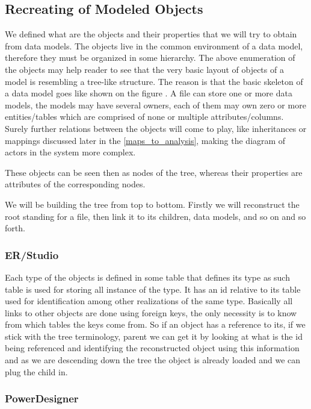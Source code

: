 \subsection{Recreating of Modeled Objects}

We defined what are the objects and their properties that we will try to obtain from data models. 
The objects live in the common environment of a data model, therefore they must be organized in some hierarchy.
 The above enumeration of the objects may help reader to see that the very basic layout of objects of a model is resembling a tree-like structure. The reason is that the basic skeleton of a data model goes like shown on the figure . A file can store one or more data models, the models may have several owners, each of them may own zero or more entities/tables which are comprised of none or multiple attributes/columns. 
 Surely further relations between the objects will come to play, like inheritances or mappings discussed later in the \autoref{maps_to_analysis}, making the diagram of actors in the system more complex.
 
 These objects can be seen then as nodes of the tree, whereas their properties are attributes of the corresponding nodes.
 
 We will be building the tree from top to bottom. Firstly we will reconstruct the root standing for a file, then link it to its children, data models, and so on and so forth.

\subsubsection{ER/Studio}

Each type of the objects is defined in some table that defines its type as such table is used for storing all instance of the type. It has an id relative to its table used for identification among other realizations of the same type. Basically all links to other objects are done using foreign keys, the only necessity is to know from which tables the keys come from. 
So if an object has a reference to its, if we stick with the tree terminology, parent we can get it by looking at what is the id being referenced and identifying the reconstructed object using this information and as we are descending down the tree the object is already loaded and we can plug the child in.

\subsubsection{PowerDesigner}

